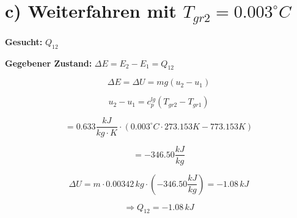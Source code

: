 \section*{c) Weiterfahren mit $T_{gr2} = 0.003^\circ C$}

\textbf{Gesucht:} $Q_{12}$

\textbf{Gegebener Zustand:} $\Delta E = E_2 - E_1 = Q_{12}$

\[
\Delta E = \Delta U = m g (u_2 - u_1)
\]

\[
u_2 - u_1 = c_p^{lg} (T_{gr2} - T_{gr1})
\]

\[
= 0.633 \frac{kJ}{kg \cdot K} \cdot (0.003^\circ C \cdot 273.153 K - 773.153 K)
\]

\[
= -346.50 \frac{kJ}{kg}
\]

\[
\Delta U = m \cdot 0.00342 \, kg \cdot (-346.50 \frac{kJ}{kg}) = -1.08 \, kJ
\]

\[
\Rightarrow Q_{12} = -1.08 \, kJ
\]